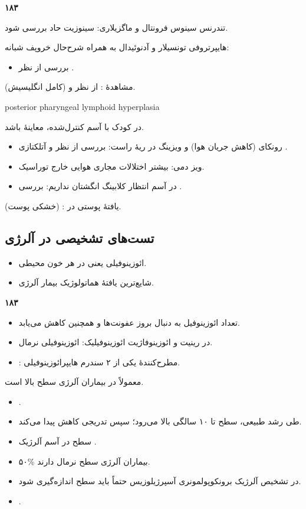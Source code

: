 \noindent\textbf{۱۸۳}\par
تندرنس سینوس فرونتال و ماگزیلاری: سینوزیت حاد بررسی شود.

هایپرتروفی تونسیلار و آدنوئیدال به همراه شرح‌حال خروپف شبانه:
\begin{itemize}
\item بررسی از نظر .
\end{itemize}
مشاهدهٔ : از نظر  و  (کامل انگلیسیش).
\begin{latin}
posterior pharyngeal lymphoid hyperplasia
\end{latin}
در کودک با آسم کنترل‌شده، معاینهٔ   باشد.
\begin{itemize}
\item رونکای (کاهش جریان هوا) و ویزینگ در ریهٔ راست: بررسی از نظر  و آتلکتازی .
\item ویز دمی: بیشتر اختلالات مجاری هوایی خارج توراسیک.
\item در آسم انتظار کلابینگ انگشتان نداریم: بررسی .
\end{itemize}
 یافتهٔ پوستی در :  (خشکی پوست).

\subsection*{تست‌های تشخیصی در آلرژی}
\begin{itemize}
\item ائوزینوفیلی یعنی  در هر  خون محیطی.
\item شایع‌ترین یافتهٔ هماتولوژیک بیمار آلرژی.
\end{itemize}

\noindent\textbf{۱۸۳}\par
\begin{itemize}
\item تعداد ائوزینوفیل به دنبال بروز عفونت‌ها و همچنین  کاهش می‌یابد.
\item در رینیت و ائوزینوفاژیت ائوزینوفیلیک: ائوزینوفیلی نرمال.
\item {}: مطرح‌کنندهٔ یکی از ۲ سندرم هایپرائوزینوفیلی.
\end{itemize}
معمولاً در بیماران آلرژی سطح  بالا است.
\begin{itemize}
\item {}.
\item طی رشد طبیعی، سطح  تا ۱۰ سالگی بالا می‌رود؛ سپس تدریجی کاهش پیدا می‌کند.
\item سطح  در  \dxen{$>$} آسم آلرژیک \dxen{$>$} .
\item ۵۰\% بیماران آلرژی سطح  نرمال دارند.
\item در تشخیص آلرژیک برونکوپولمونری آسپرژیلوزیس حتماً باید سطح  اندازه‌گیری شود.
\item {}.
\end{itemize}

